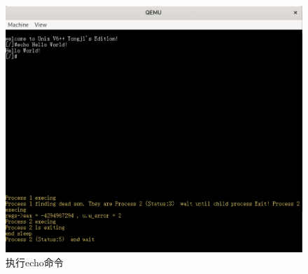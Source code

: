 \begin{figure}[!htbp]
    \centering
    \includegraphics[scale=0.5]{fig/helloWorld.png}
    \caption{执行echo命令}\label{helloWorld}
\end{figure}

